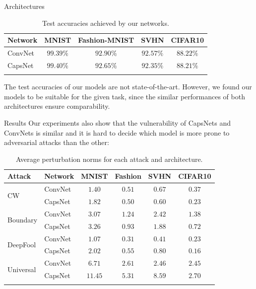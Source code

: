 \documentclass[final]{beamer}
\newlength{\onecolwid}
\newlength{\twocolwid}
\begin{document}
\begin{frame}[t]
\begin{columns}[t]
\begin{column}{\twocolwid}
\begin{columns}[t,totalwidth=\twocolwid]
\begin{column}{\onecolwid}
\begin{block}{Architectures}
						\begin{table}[h]
							\centering\small{
								\begin{tabular}{lcccc}
									\toprule
									Network       & MNIST & Fashion-MNIST & SVHN & CIFAR10  \\
									\midrule
									ConvNet           & $99.39\%$ & $92.90\%$ & $92.57\%$ & $88.22\%$ \\
									CapsNet           & $99.40\%$ & $92.65\%$ & $92.35\%$ & $88.21\%$ \\
									\bottomrule\\
							\end{tabular}}
							\caption{Test accuracies achieved by our networks.}
						\end{table}
						
						The test accuracies of our models are not state-of-the-art. However, we found our models to be suitable for the given task, since the similar performances of both architectures ensure comparability. 
						
					\end{block}
					
					\begin{block}{Results}
						Our experiments also show that
						the vulnerability of CapsNets and ConvNets is similar and it is hard
						to decide which model is more prone to adversarial attacks than the
						other:
						\vspace{1cm}
						\begin{table}
							\centering\small{
								\begin{tabular}{llcccc}
									\toprule
									Attack & Network       & MNIST & Fashion & SVHN & CIFAR10  \\
									\midrule
									\multirow{2}{*}{CW} & ConvNet & {$1.40$} & $0.51$ & $0.67$ & $0.37$ \\
									& CapsNet            & $1.82$ & {$0.50$} & {$0.60$} & {$0.23$} \\
									\midrule
									\multirow{2}{*}{Boundary} & ConvNet & {$3.07$} & $1.24$ & $2.42$ & $1.38$ \\
									& CapsNet            & $3.26$ & {$0.93$} & {$1.88$} & {$0.72$} \\
									\midrule
									\multirow{2}{*}{DeepFool} & ConvNet & {$1.07$} & {$0.31$} & {$0.41$} & $0.23$ \\
									& CapsNet           & $2.02$ & $0.55$ & $0.80$ & {$0.16$} \\
									\midrule
									\multirow{2}{*}{Universal} & ConvNet & {$6.71$} & {$2.61$} & {$2.46$} & {$2.45$} \\
									& CapsNet           & $11.45$ & $5.31$ & $8.59$ & $2.70$ \\
									\bottomrule\\
							\end{tabular}}
							\caption{Average perturbation norms for each attack and architecture.}
							\label{tab:norms}
						\end{table}
						

\end{block}
\end{column}
\end{columns}
\end{column}
\end{columns}
\end{frame}
\end{document}
